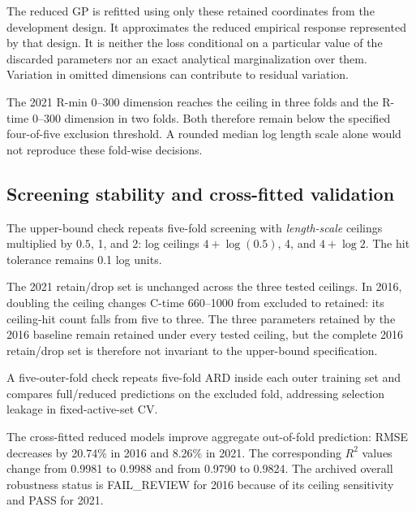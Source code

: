 \documentclass[11pt,a4paper]{article}
\begin{document}
The reduced GP is refitted using only these retained coordinates from the
development design. It approximates the reduced empirical response represented
by that design. It is neither the loss conditional on a particular value of
the discarded parameters nor an exact analytical marginalization over them.
Variation in omitted dimensions can contribute to residual variation.

The 2021 R-min 0--300 dimension reaches the ceiling in three folds and the
R-time 0--300 dimension in two folds. Both therefore remain below the specified
four-of-five exclusion threshold. A rounded median log length scale alone would
not reproduce these fold-wise decisions.

\newpage
\subsection*{Screening stability and cross-fitted validation}
The upper-bound check repeats five-fold screening with \emph{length-scale}
ceilings multiplied by $0.5$, 1, and 2: log ceilings $4+\log(0.5)$, 4, and
$4+\log2$. The hit tolerance remains 0.1 log units.
\begin{center}
\small\setlength{\tabcolsep}{4pt}
\end{center}
The 2021 retain/drop set is unchanged across the three tested ceilings.
In 2016, doubling the ceiling changes C-time 660--1000 from excluded
to retained: its ceiling-hit count falls from five to three. The three
parameters retained by the 2016 baseline remain retained under every tested
ceiling, but the complete 2016 retain/drop set is therefore not invariant
to the upper-bound specification.

A five-outer-fold check repeats five-fold ARD inside each outer training set
and compares full/reduced predictions on the excluded fold, addressing
selection leakage in fixed-active-set CV.
\begin{center}
\small
\end{center}
The cross-fitted reduced models improve aggregate out-of-fold prediction:
RMSE decreases by 20.74\% in 2016 and 8.26\% in 2021. The corresponding
$R^2$ values change from 0.9981 to 0.9988 and from 0.9790 to 0.9824.
The archived overall robustness status is FAIL\_REVIEW for 2016 because
of its ceiling sensitivity and PASS for 2021.
\end{document}
